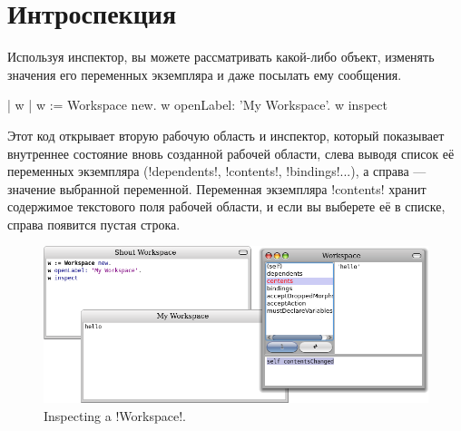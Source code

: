 \documentclass[a4paper,10pt,twoside]{book}
\begin{document}
\section{Интроспекция}

Используя инспектор, вы можете рассматривать какой-либо объект, изменять значения его переменных экземпляра и даже посылать ему сообщения. 

\begin{code}{| w |}
w := Workspace new.
w openLabel: 'My Workspace'.
w inspect
\end{code}

Этот код открывает вторую рабочую область и инспектор,
который показывает внутреннее состояние вновь созданной рабочей области, слева выводя список её переменных экземпляра (\ct!dependents!, \ct!contents!, \ct!bindings!...), а справа --- значение выбранной переменной.
Переменная экземпляра \ct!contents! хранит содержимое текстового поля рабочей области, и если вы выберете её в списке, справа появится пустая строка.

\begin{figure}[ht]\centering
	\includegraphics[width=\linewidth]{workspaceInspector}
	\caption{Inspecting a \ct!Workspace!.}
\end{figure}
\end{document}
